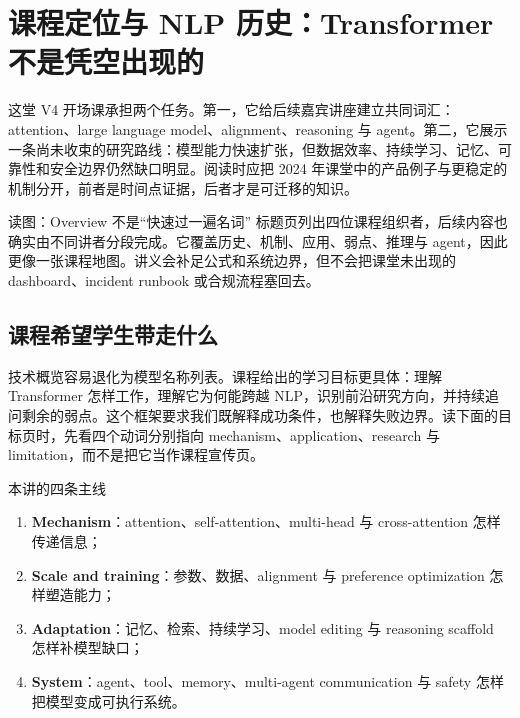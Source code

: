 \section{课程定位与 NLP 历史：Transformer 不是凭空出现的}

这堂 V4 开场课承担两个任务。第一，它给后续嘉宾讲座建立共同词汇：attention、large language model、alignment、reasoning 与 agent。第二，它展示一条尚未收束的研究路线：模型能力快速扩张，但数据效率、持续学习、记忆、可靠性和安全边界仍然缺口明显。阅读时应把 2024 年课堂中的产品例子与更稳定的机制分开，前者是时间点证据，后者才是可迁移的知识。


\begin{knowledgebox}{读图：Overview 不是“快速过一遍名词”}
标题页列出四位课程组织者，后续内容也确实由不同讲者分段完成。它覆盖历史、机制、应用、弱点、推理与 agent，因此更像一张课程地图。讲义会补足公式和系统边界，但不会把课堂未出现的 dashboard、incident runbook 或合规流程塞回去。
\end{knowledgebox}


\subsection{课程希望学生带走什么}

技术概览容易退化为模型名称列表。课程给出的学习目标更具体：理解 Transformer 怎样工作，理解它为何能跨越 NLP，识别前沿研究方向，并持续追问剩余的弱点。这个框架要求我们既解释成功条件，也解释失败边界。读下面的目标页时，先看四个动词分别指向 mechanism、application、research 与 limitation，而不是把它当作课程宣传页。


\begin{importantbox}{本讲的四条主线}
\begin{enumerate}
  \item \textbf{Mechanism}：attention、self-attention、multi-head 与 cross-attention 怎样传递信息；
  \item \textbf{Scale and training}：参数、数据、alignment 与 preference optimization 怎样塑造能力；
  \item \textbf{Adaptation}：记忆、检索、持续学习、model editing 与 reasoning scaffold 怎样补模型缺口；
  \item \textbf{System}：agent、tool、memory、multi-agent communication 与 safety 怎样把模型变成可执行系统。
\end{enumerate}
\end{importantbox}

